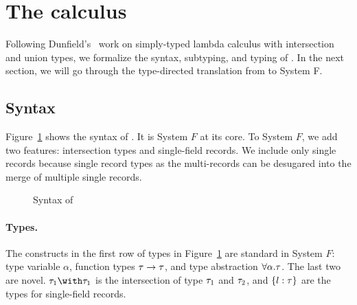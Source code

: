 \section{The \name calculus}



Following Dunfield's~\cite{dunfield2014elaborating} work on simply-typed lambda
calculus with intersection and union types, we formalize the syntax, subtyping,
and typing of \name. In the next section, we will go through the type-directed
translation from \name to System F.



\subsection{Syntax}

Figure~\ref{fig:fi-syntax} shows the syntax of \name. It is System $ F $ at its
core. To System $ F $, we add two features: intersection types and single-field
records.
We include only single records because single record types as the multi-records
can be desugared into the merge of multiple single records.

\begin{figure}
  
  \caption{Syntax of \name}
  \label{fig:fi-syntax}
\end{figure}

\paragraph{Types.} The constructs in the first row of types in
Figure~\ref{fig:fi-syntax} are standard in System $ F $: type variable
$ \alpha $, function types $ \tau \to \tau $, and type abstraction
$ \forall \alpha. \tau $. The last two are novel. $ \ty_1 \intersects \ty_1 $ is
the intersection of type $ \tau_1 $ and $ \tau_2 $, 
and $ \{ l : \tau \} $ are the types for single-field records.

